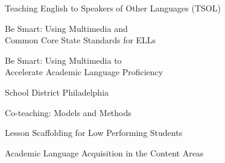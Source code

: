 \documentclass[]{scrartcl}
\begin{document}
\begin{cleanCV}


\vspace{2.2em}


\newcommand{\DCPS}{District of Columbia Public Schools}

\newcommand{\DCOR}
{District of Columbia Public Schools\\
Office Professional Development: Coaches Institute}

\newcommand{\TSOL}
{Teaching English to Speakers of Other Languages\\
(TESOL) Convention 2012}

\newcommand{\SDP}{School District Philadelphia}
\newcommand{\TAGGERT}{Taggart Elementary School}

\WorkExperienceX{}
{Teaching English to Speakers of Other Languages (TSOL)}{}

{Be Smart: Using Multimedia and\\Common Core State Standards for ELLs}

{Be Smart: Using Multimedia to\\ Accelerate Academic Language Proficiency }









\WorkExperienceX{}
{\SDP}{}

{Co-teaching: Models and Methods}

{Lesson Scaffolding for Low Performing Students}

{Academic Language Acquisition in the Content Areas}

\end{cleanCV}
\end{document}
